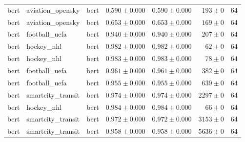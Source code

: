 \begin{table}[htbp]
\begin{tabular}{l l l r r r r}
bert & aviation\_opensky & bert & $0.590\pm0.000$ & $0.590\pm0.000$ & $193\pm0$ & 64 \\
bert & aviation\_opensky & bert & $0.653\pm0.000$ & $0.653\pm0.000$ & $169\pm0$ & 64 \\
bert & football\_uefa & bert & $0.940\pm0.000$ & $0.940\pm0.000$ & $207\pm0$ & 64 \\
bert & hockey\_nhl & bert & $0.982\pm0.000$ & $0.982\pm0.000$ & $62\pm0$ & 64 \\
bert & hockey\_nhl & bert & $0.983\pm0.000$ & $0.983\pm0.000$ & $78\pm0$ & 64 \\
bert & football\_uefa & bert & $0.961\pm0.000$ & $0.961\pm0.000$ & $382\pm0$ & 64 \\
bert & football\_uefa & bert & $0.955\pm0.000$ & $0.955\pm0.000$ & $639\pm0$ & 64 \\
bert & smartcity\_transit & bert & $0.974\pm0.000$ & $0.974\pm0.000$ & $2297\pm0$ & 64 \\
bert & hockey\_nhl & bert & $0.984\pm0.000$ & $0.984\pm0.000$ & $66\pm0$ & 64 \\
bert & smartcity\_transit & bert & $0.972\pm0.000$ & $0.972\pm0.000$ & $3153\pm0$ & 64 \\
bert & smartcity\_transit & bert & $0.958\pm0.000$ & $0.958\pm0.000$ & $5636\pm0$ & 64 \\
\hline
\end{tabular}
\end{table}
